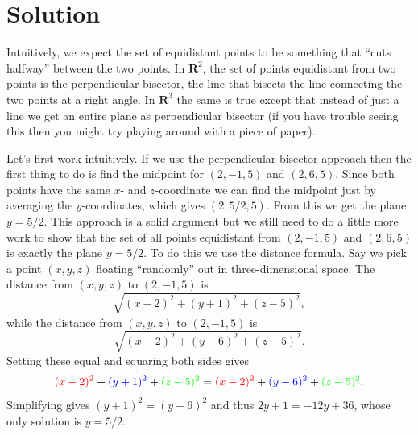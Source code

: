 \documentclass[11pt]{article}
\renewcommand{\R}{\mathbf{R}}
\begin{document}
\section*{Solution}
Intuitively, we expect the set of equidistant points to be something that ``cuts halfway'' between the two points. In $\R^2$, the set of points equidistant from two points is the perpendicular bisector, the line that bisects the line connecting the two points at a right angle. In $\R^3$ the same is true except that instead of just a line we get an entire plane as perpendicular bisector (if you have trouble seeing this then you might try playing around with a piece of paper).
\begin{enum}{\alph}
\item Let's first work intuitively. If we use the perpendicular bisector approach then the first thing to do is find the midpoint for $(2,-1,5)$ and $(2,6,5)$. Since both points have the same $x$- and $z$-coordinate we can find the midpoint just by averaging the $y$-coordinates, which gives $(2,5/2,5)$. From this we get the plane $y=5/2$. This approach is a solid argument but we still need to do a little more work to show that the set of all points equidistant from $(2,-1,5)$ and $(2,6,5)$ is exactly the plane $y=5/2$. To do this we use the distance formula. Say we pick a point $(x,y,z)$ floating ``randomly'' out in three-dimensional space. The distance from $(x,y,z)$ to $(2,-1,5)$ is 
$$\sqrt{(x-2)^2+(y+1)^2+(z-5)^2},$$
while the distance from $(x,y,z)$ to $(2,-1,5)$ is 
$$\sqrt{(x-2)^2+(y-6)^2+(z-5)^2}.$$
Setting these equal and squaring both sides gives
\begin{align*}
\textcolor{red}{(x-2)^2}+\textcolor{blue}{(y+1)^2}+\textcolor{green}{(z-5)^2}
=\textcolor{red}{(x-2)^2}+\textcolor{blue}{(y-6)^2}+\textcolor{green}{(z-5)^2}.
\end{align*}
Simplifying gives $(y+1)^2=(y-6)^2$ and thus $2y+1=-12y+36$, whose only solution is $y=5/2$.


\end{enum}
\end{document}
